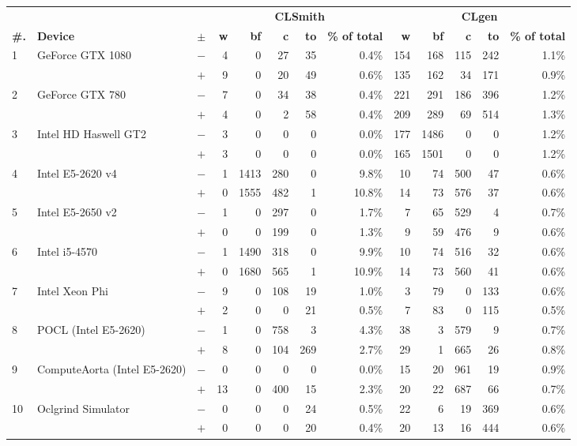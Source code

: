   \begin{tabular}{lll | rrrrr | rrrrr }
  \toprule
  & & & \multicolumn{5}{c|}{\textbf{CLSmith}} & \multicolumn{5}{c}{\textbf{CLgen}} \\
  \textbf{\#.} & \textbf{Device} & $\pm$ &
  \textbf{w} & \textbf{bf} & \textbf{c} & \textbf{to} & \textbf{\% of total} &
  \textbf{w} & \textbf{bf} & \textbf{c} & \textbf{to} & \textbf{\% of total} \\
  \midrule
  \multirow{ 2}{*}{1} & \multirow{ 2}{*}{GeForce GTX 1080} & $-$ & 4 & 0 & 27 & 35 & 0.4\%       & 154 & 168 & 115 & 242 & 1.1\% \\& & $+$ & 9 & 0 & 20 & 49 & 0.6\% & 135 & 162 & 34 & 171 & 0.9\% \\
\hline
\multirow{ 2}{*}{2} & \multirow{ 2}{*}{GeForce GTX 780} & $-$ & 7 & 0 & 34 & 38 & 0.4\%       & 221 & 291 & 186 & 396 & 1.2\% \\& & $+$ & 4 & 0 & 2 & 58 & 0.4\% & 209 & 289 & 69 & 514 & 1.3\% \\
\hline
\multirow{ 2}{*}{3} & \multirow{ 2}{*}{Intel HD Haswell GT2} & $-$ & 3 & 0 & 0 & 0 & 0.0\%       & 177 & 1486 & 0 & 0 & 1.2\% \\& & $+$ & 3 & 0 & 0 & 0 & 0.0\% & 165 & 1501 & 0 & 0 & 1.2\% \\
\hline
\multirow{ 2}{*}{4} & \multirow{ 2}{*}{Intel E5-2620 v4} & $-$ & 1 & 1413 & 280 & 0 & 9.8\%       & 10 & 74 & 500 & 47 & 0.6\% \\& & $+$ & 0 & 1555 & 482 & 1 & 10.8\% & 14 & 73 & 576 & 37 & 0.6\% \\
\hline
\multirow{ 2}{*}{5} & \multirow{ 2}{*}{Intel E5-2650 v2} & $-$ & 1 & 0 & 297 & 0 & 1.7\%       & 7 & 65 & 529 & 4 & 0.7\% \\& & $+$ & 0 & 0 & 199 & 0 & 1.3\% & 9 & 59 & 476 & 9 & 0.6\% \\
\hline
\multirow{ 2}{*}{6} & \multirow{ 2}{*}{Intel i5-4570} & $-$ & 1 & 1490 & 318 & 0 & 9.9\%       & 10 & 74 & 516 & 32 & 0.6\% \\& & $+$ & 0 & 1680 & 565 & 1 & 10.9\% & 14 & 73 & 560 & 41 & 0.6\% \\
\hline
\multirow{ 2}{*}{7} & \multirow{ 2}{*}{Intel Xeon Phi} & $-$ & 9 & 0 & 108 & 19 & 1.0\%       & 3 & 79 & 0 & 133 & 0.6\% \\& & $+$ & 2 & 0 & 0 & 21 & 0.5\% & 7 & 83 & 0 & 115 & 0.5\% \\
\hline
\multirow{ 2}{*}{8} & \multirow{ 2}{*}{POCL (Intel E5-2620)} & $-$ & 1 & 0 & 758 & 3 & 4.3\%       & 38 & 3 & 579 & 9 & 0.7\% \\& & $+$ & 8 & 0 & 104 & 269 & 2.7\% & 29 & 1 & 665 & 26 & 0.8\% \\
\hline
\multirow{ 2}{*}{9} & \multirow{ 2}{*}{ComputeAorta (Intel E5-2620)} & $-$ & 0 & 0 & 0 & 0 & 0.0\%       & 15 & 20 & 961 & 19 & 0.9\% \\& & $+$ & 13 & 0 & 400 & 15 & 2.3\% & 20 & 22 & 687 & 66 & 0.7\% \\
\hline
\multirow{ 2}{*}{10} & \multirow{ 2}{*}{Oclgrind Simulator} & $-$ & 0 & 0 & 0 & 24 & 0.5\%       & 22 & 6 & 19 & 369 & 0.6\% \\& & $+$ & 0 & 0 & 0 & 20 & 0.4\% & 20 & 13 & 16 & 444 & 0.6\% \\
  \bottomrule
\end{tabular}

